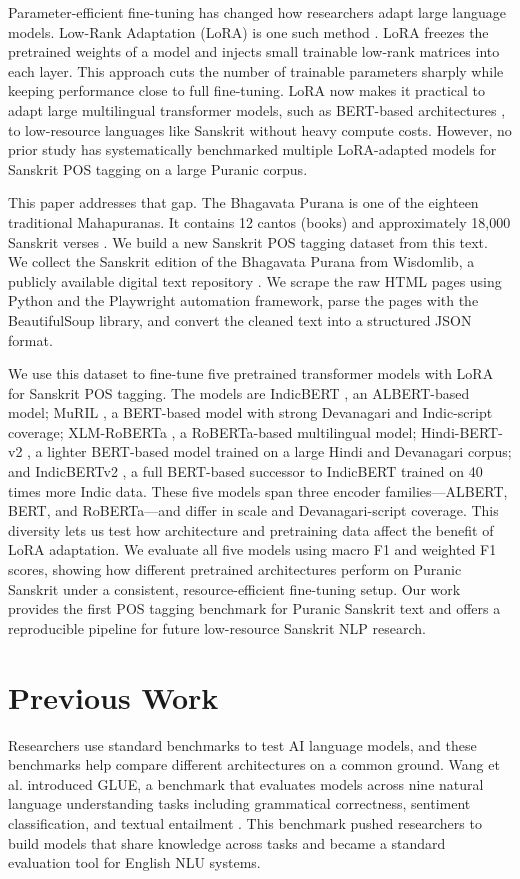 \documentclass[conference]{IEEEtran}
\begin{document}
Parameter-efficient fine-tuning has changed how researchers adapt large language models. Low-Rank Adaptation (LoRA) is one such method \cite{hu2022lora}. LoRA freezes the pretrained weights of a model and injects small trainable low-rank matrices into each layer. This approach cuts the number of trainable parameters sharply while keeping performance close to full fine-tuning. LoRA now makes it practical to adapt large multilingual transformer models, such as BERT-based architectures \cite{devlin2019bert}, to low-resource languages like Sanskrit without heavy compute costs. However, no prior study has systematically benchmarked multiple LoRA-adapted models for Sanskrit POS tagging on a large Puranic corpus.

This paper addresses that gap. The Bhagavata Purana is one of the eighteen traditional Mahapuranas. It contains 12 cantos (books) and approximately 18,000 Sanskrit verses \cite{wisdomlib}. We build a new Sanskrit POS tagging dataset from this text. We collect the Sanskrit edition of the Bhagavata Purana from Wisdomlib, a publicly available digital text repository \cite{wisdomlib}. We scrape the raw HTML pages using Python and the Playwright automation framework, parse the pages with the BeautifulSoup library, and convert the cleaned text into a structured JSON format.

We use this dataset to fine-tune five pretrained transformer models with LoRA for Sanskrit POS tagging. The models are IndicBERT \cite{kakwani2020}, an ALBERT-based model; MuRIL \cite{khanuja2021muril}, a BERT-based model with strong Devanagari and Indic-script coverage; XLM-RoBERTa \cite{conneau2020xlmr}, a RoBERTa-based multilingual model; Hindi-BERT-v2 \cite{joshi2022hindbert}, a lighter BERT-based model trained on a large Hindi and Devanagari corpus; and IndicBERTv2 \cite{doddapaneni2023}, a full BERT-based successor to IndicBERT trained on 40 times more Indic data. These five models span three encoder families---ALBERT, BERT, and RoBERTa---and differ in scale and Devanagari-script coverage. This diversity lets us test how architecture and pretraining data affect the benefit of LoRA adaptation. We evaluate all five models using macro F1 and weighted F1 scores, showing how different pretrained architectures perform on Puranic Sanskrit under a consistent, resource-efficient fine-tuning setup. Our work provides the first POS tagging benchmark for Puranic Sanskrit text and offers a reproducible pipeline for future low-resource Sanskrit NLP research.

\section{Previous Work}
Researchers use standard benchmarks to test AI language models, and these benchmarks help compare different architectures on a common ground. Wang et al. introduced GLUE, a benchmark that evaluates models across nine natural language understanding tasks including grammatical correctness, sentiment classification, and textual entailment \cite{wang2018glue}. This benchmark pushed researchers to build models that share knowledge across tasks and became a standard evaluation tool for English NLU systems.
\end{document}
